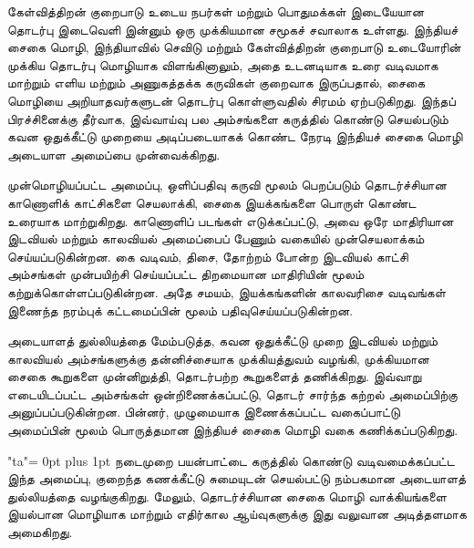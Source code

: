 \begin{abstracttamil}
{\tamilfont
\setlength{\parskip}{1em}
\setlength{\parindent}{0pt}
\raggedright

கேள்வித்திறன் குறைபாடு உடைய நபர்கள் மற்றும் பொதுமக்கள் இடையேயான தொடர்பு இடைவெளி இன்னும் ஒரு முக்கியமான சமூகச் சவாலாக உள்ளது. இந்தியச் சைகை மொழி, இந்தியாவில் செவிடு மற்றும் கேள்வித்திறன் குறைபாடு உடையோரின் முக்கிய தொடர்பு மொழியாக விளங்கினாலும், அதை உடனடியாக உரை வடிவமாக மாற்றும் எளிய மற்றும் அணுகத்தக்க கருவிகள் குறைவாக இருப்பதால், சைகை மொழியை அறியாதவர்களுடன் தொடர்பு கொள்ளுவதில் சிரமம் ஏற்படுகிறது. இந்தப் பிரச்சினைக்கு தீர்வாக, இவ்வாய்வு பல அம்சங்களை கருத்தில் கொண்டு செயல்படும் கவன ஒதுக்கீட்டு முறையை அடிப்படையாகக் கொண்ட நேரடி இந்தியச் சைகை மொழி அடையாள அமைப்பை முன்வைக்கிறது.

முன்மொழியப்பட்ட அமைப்பு, ஒளிப்பதிவு கருவி மூலம் பெறப்படும் தொடர்ச்சியான காணொளிக் காட்சிகளை செயலாக்கி, சைகை இயக்கங்களை பொருள் கொண்ட உரையாக மாற்றுகிறது. காணொளிப் படங்கள் எடுக்கப்பட்டு, அவை ஒரே மாதிரியான இடவியல் மற்றும் காலவியல் அமைப்பைப் பேணும் வகையில் முன்செயலாக்கம் செய்யப்படுகின்றன. கை வடிவம், திசை, தோற்றம் போன்ற இடவியல் காட்சி அம்சங்கள் முன்பயிற்சி செய்யப்பட்ட திறமையான மாதிரியின் மூலம் கற்றுக்கொள்ளப்படுகின்றன. அதே சமயம், இயக்கங்களின் காலவரிசை வடிவங்கள் இணைந்த நரம்புக் கட்டமைப்பின் மூலம் பதிவுசெய்யப்படுகின்றன.

அடையாளத் துல்லியத்தை மேம்படுத்த, கவன ஒதுக்கீட்டு முறை இடவியல் மற்றும் காலவியல் அம்சங்களுக்கு தன்னிச்சையாக முக்கியத்துவம் வழங்கி, முக்கியமான சைகை கூறுகளை முன்னிறுத்தி, தொடர்பற்ற கூறுகளைத் தணிக்கிறது. இவ்வாறு எடையிடப்பட்ட அம்சங்கள் ஒன்றிணைக்கப்பட்டு, தொடர் சார்ந்த கற்றல் அமைப்பிற்கு அனுப்பப்படுகின்றன. பின்னர், முழுமையாக இணைக்கப்பட்ட வகைப்பாட்டு அமைப்பின் மூலம் பொருத்தமான இந்தியச் சைகை மொழி வகை கணிக்கப்படுகிறது.

{\XeTeXlinebreaklocale "ta"\XeTeXlinebreakskip = 0pt plus 1pt
நடைமுறை பயன்பாட்டை கருத்தில் கொண்டு வடிவமைக்கப்பட்ட இந்த அமைப்பு, குறைந்த கணக்கீட்டு சுமையுடன் செயல்பட்டு நம்பகமான அடையாளத் துல்லியத்தை வழங்குகிறது. மேலும், தொடர்ச்சியான சைகை மொழி வாக்கியங்களை இயல்பான மொழியாக மாற்றும் எதிர்கால ஆய்வுகளுக்கு இது வலுவான அடித்தளமாக அமைகிறது.\par}
}
\end{abstracttamil}
